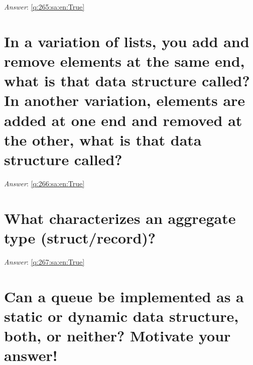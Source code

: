 \documentclass[a4paper,11pt,oneside]{book}
\begin{document}
\begin{sloppypar}
\label{q:265:sa:en:False}

\vspace{2cm}

\noindent\makebox[\textwidth]{\hrulefill}

\vspace{1cm}

\textit{Answer}: \autoref{q:265:sa:en:True}



\section{In a variation of lists, you add and remove elements at the same end, what is that data structure called? In another variation, elements are added at one end and removed at the other, what is that data structure called?}

\label{q:266:sa:en:False}

\vspace{2cm}

\noindent\makebox[\textwidth]{\hrulefill}

\vspace{1cm}

\textit{Answer}: \autoref{q:266:sa:en:True}



\section{What characterizes an aggregate type (struct/record)?}

\label{q:267:sa:en:False}

\vspace{2cm}

\noindent\makebox[\textwidth]{\hrulefill}

\vspace{1cm}

\textit{Answer}: \autoref{q:267:sa:en:True}



\section{Can a queue be implemented as a static or dynamic data structure, both, or neither? Motivate your answer!}

\label{q:268:sa:en:False}

\vspace{2cm}

\noindent\makebox[\textwidth]{\hrulefill}


\end{sloppypar}
\end{document}

